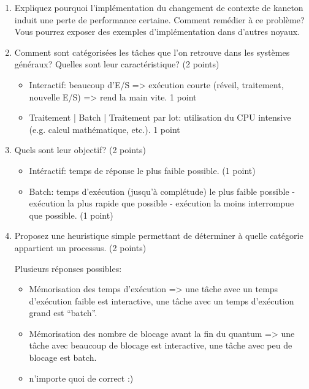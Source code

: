 \begin{enumerate}

\item Expliquez pourquoi l'implémentation du changement de contexte de
      kaneton induit une perte de performance certaine. Comment remédier à
      ce problème? Vous pourrez exposer des exemples d'implémentation dans
      d'autres noyaux.


\item Comment sont catégorisées les tâches que l'on retrouve dans les systèmes généraux? Quelles sont leur caractéristique? (2 points)

\begin{correction}
\begin{itemize}
  \item Interactif: beaucoup d'E/S => exécution courte (réveil, traitement, nouvelle E/S) => rend la main vite.  1 point
  \item Traitement | Batch | Traitement par lot: utilisation du CPU intensive (e.g. calcul mathématique, etc.). 1 point
\end{itemize}
\end{correction}


\item Quels sont leur objectif? (2 points)

\begin{correction}
\begin{itemize}
  \item Intéractif: temps de réponse le plus faible possible. (1 point)
  \item Batch: temps d'exécution (jusqu'à complétude) le plus faible possible - exécution la plus rapide que possible - exécution la moins interrompue que possible. (1 point)
\end{itemize}
\end{correction}


\item Proposez une heuristique simple permettant de déterminer à quelle catégorie appartient un processus. (2 points)

\begin{correction}
Plusieurs réponses possibles:
\begin{itemize}
  \item Mémorisation des temps d'exécution => une tâche avec un temps d'exécution faible est interactive, une tâche avec un temps d'exécution grand est “batch”.
  \item Mémorisation des nombre de blocage avant la fin du quantum => une tâche avec beaucoup de blocage est interactive, une tâche avec peu de blocage est batch.
  \item n'importe quoi de correct :)
\end{itemize}
\end{correction}



\end{enumerate}
